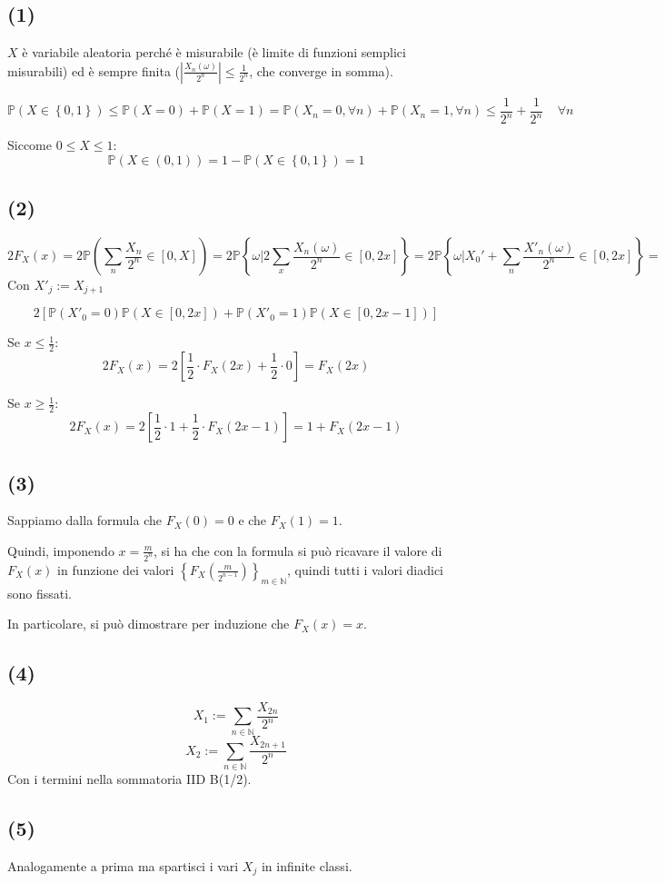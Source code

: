 \documentclass{article}
\begin{document}
\subsection{(1)}
$X$ è variabile aleatoria perché è misurabile (è limite di funzioni semplici misurabili) ed è sempre finita ($\left| \frac{X_n(\omega )}{2^n} \right| \leq  \frac{1}{2^n}$, che converge in somma).

\[
	\mathbb{P}\left(X\in \left\{0,1\right\}\right) \leq  \mathbb{P}\left(X=0\right) + \mathbb{P}\left(X=1\right) = \mathbb{P}\left(X_n = 0, \forall  n\right) + \mathbb{P}\left(X_n = 1, \forall  n\right)  \leq  \frac{1}{2^n} + \frac{1}{2^n} \ \ \ \ \  \forall  n
\]

Siccome $0 \leq  X \leq  1$:
\[
	\mathbb{P}\left(X \in (0,1)\right) = 1-\mathbb{P}\left(X \in \left\{0,1\right\}\right) = 1
\]

\subsection{(2)}
\[
	2F_X(x) = 2\mathbb{P}\left(\sum_{n} \frac{X_n}{2^n} \in  [0,X]\right) = 2 \mathbb{P}\left\{\omega  | 2\sum_{x}\frac{X_n (\omega )}{2^n} \in  [0,2x]\right\} = 2\mathbb{P}\left\{\omega  | X_0' + \sum_{n}\frac{X'_n(\omega )}{2^n} \in  [0,2x]\right\} = 
\]
Con $X'_j := X_{j+1}$

\[
	2\left[\mathbb{P}\left(X'_0=0\right) \mathbb{P}\left(X\in [0,2x]\right)  +  \mathbb{P}\left(X'_0=1\right)\mathbb{P}\left(X\in [0,2x-1]\right)\right]
\]

Se $x \leq  \frac{1}{2}$:
\[
	2F_X(x) = 2\left[\frac{1}{2} \cdot  F_X(2x) + \frac{1}{2} \cdot  0\right] = F_X(2x)
\]

Se $x \geq  \frac{1}{2}$:
\[
	2F_X(x) = 2\left[\frac{1}{2} \cdot  1 + \frac{1}{2} \cdot  F_X(2x-1)\right] = 1+F_X(2x-1)
\]


\subsection{(3)}
Sappiamo dalla formula che $F_X\left(0\right)=0$ e che $F_X(1)=1$.

Quindi, imponendo $x=\frac{m}{2^n}$, si ha che con la formula si può ricavare il valore di $F_X(x)$ in funzione dei valori $\left\{F_X(\frac{m}{2^{n-1}})\right\}_{m\in \mathbb{N}}$, quindi tutti i valori diadici sono fissati.

In particolare, si può dimostrare per induzione che $F_X(x) = x$.

\subsection{(4)}
\[
	X_1 := \sum_{n\in \mathbb{N}} \frac{X_{2n}}{2^n}
\]
\[
	X_2 := \sum_{n\in \mathbb{N}}\frac{X_{2n+1}}{2^n}
\]
Con i termini nella sommatoria IID B(1/2).

\subsection{(5)}
Analogamente a prima ma spartisci i vari $X_j$ in infinite classi.
\end{document}
